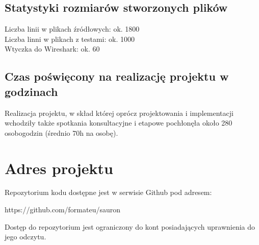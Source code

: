 \documentclass[a4paper,11pt]{article}
\begin{document}
\subsection{Statystyki rozmiarów stworzonych plików}
Liczba linii w plikach źródłowych: ok. 1800 \\
Liczba linni w plikach z testami: ok. 1000 \\
Wtyczka do Wireshark: ok. 60

\subsection{Czas poświęcony na realizację projektu w godzinach}
Realizacja projektu, w skład której oprócz projektowania i implementacji wchodziły także
spotkania konsultacyjne i etapowe pochłonęła około 280 osobogodzin (średnio 70h na osobę).

\section{Adres projektu}
Repozytorium kodu dostępne jest w serwisie Github pod adresem:
\begin{center}https://github.com/formateu/sauron \end{center}
Dostęp do repozytorium jest ograniczony do kont posiadających uprawnienia do jego odczytu.
\end{document}
